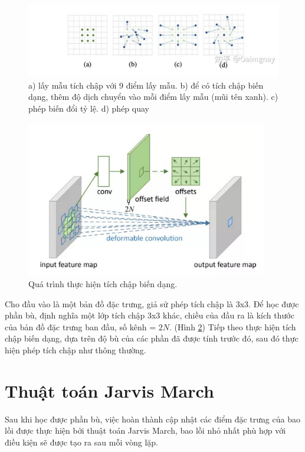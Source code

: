 \documentclass[12pt,a4paper,openany,oneside]{report}
\begin{document}
\begin{figure}[ht!]
	\begin{center}
		\includegraphics[width=445px]{./feature_offset_type.jpg}
		\caption{a) lấy mẫu tích chập với 9 điểm lấy mẫu. b) để có tích chập biến dạng, thêm độ dịch chuyển vào mỗi điểm lấy mẫu (mũi tên xanh). c) phép biến đổi tỷ lệ. d) phép quay
		}
		\label{offset_deformable_convolution}
	\end{center}
\end{figure} 

\begin{figure}[ht!]
	\begin{center}
		\includegraphics[width=400px]{./deformable_process.jpg}
		\caption{Quá trình thực hiện tích chập biến dạng.}
		\label{deformable_process}
	\end{center}
\end{figure} 


Cho đầu vào là một bản đồ đặc trưng, giả sử phép tích chập là 3x3. Để học được phần bù, định nghĩa một lớp tích chập 3x3 khác, chiều của đầu ra là kích thước của bản đồ đặc trưng ban đầu, số kênh = $2N$. (Hình \ref{deformable_process}) Tiếp theo thực hiện tích chập biến dạng, dựa trên độ bù của các phần đã được tính trước đó, sau đó thực hiện phép tích chập như thông thường.
\section{Thuật toán Jarvis March}
Sau khi học được phần bù, việc hoàn thành cập nhật các điểm đặc trưng của bao lồi được thực hiện bởi thuật toán Jarvis March, bao lồi nhỏ nhất phù hợp với điều kiện sẽ được tạo ra sau mỗi vòng lặp.
\end{document}
